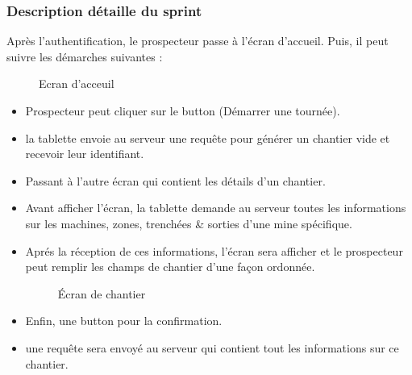 \subsubsection{Description d\'etaille du sprint}

Apr\`es l'authentification, le prospecteur passe \`a l'\'ecran d'accueil. Puis, il peut suivre les d\'emarches suivantes :
\begin{figure}[H]
	\caption{\label{fig:my-label} Ecran d'acceuil}
\end{figure}
\begin{itemize}
\item Prospecteur peut cliquer sur le button (D\'emarrer une tourn\'ee).
\item la tablette envoie au serveur une requ\^ete pour g\'en\'erer un chantier vide et recevoir leur identifiant.
\item Passant \`a l'autre \'ecran qui contient les d\'etails d'un chantier.
\item Avant afficher l'\'ecran, la tablette demande au serveur toutes les informations sur les machines, zones, trench\'ees \& sorties d'une mine sp\'ecifique.
\item Apr\'es la r\'eception de ces informations, l'\'ecran sera afficher et le prospecteur peut remplir les champs de chantier d'une fa\c{c}on ordonn\'ee.
\begin{figure}[H]
	\caption{\label{fig:my-label} \'Ecran de chantier}
\end{figure}
\item Enfin, une button pour la  confirmation.
\item une requ\^ete sera envoy\'e au serveur qui contient tout les informations sur ce chantier.
\end{itemize} 

